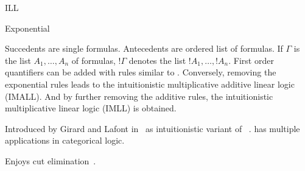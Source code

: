 \begin{entry}{ILL}
\begin{calculus}
\begin{infruleset}{Exponential}
  \sepproof
  \sepproof
  \sepproof
\end{infruleset}

\vspace{-1em}


\end{calculus}

\begin{clarifications}
  Succedents are single formulas.
  Antecedents are ordered list of formulas.
  If $\Gamma$ is the list $A_1, \ldots, A_n$ of formulas, $!\Gamma$ denotes the list $!A_1, \ldots, !A_n$.
  First order quantifiers can be added with rules similar to \LJ {}.
  Conversely, removing the exponential rules leads to the intuitionistic multiplicative additive linear logic (IMALL).
  And by further removing the additive rules, the intuitionistic multiplicative linear logic (IMLL) \cite{mints1977closed} is obtained.
\end{clarifications}

\begin{history}
  Introduced by Girard and Lafont in~\cite{lafont1987tapsoft} as intuitionistic variant of \LL~.
  \ILL has multiple applications in categorical logic.
\end{history}

\begin{technicalities}
  Enjoys cut elimination~\cite{lafont1987tapsoft}.
\end{technicalities}


\end{entry}
